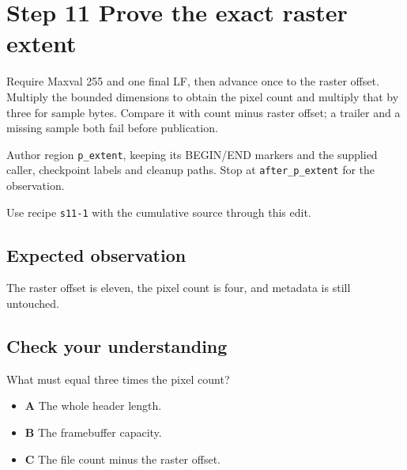 \section{Step 11 Prove the exact raster extent}\label{ppm-s11}

Require Maxval 255 and one final LF, then advance once to the raster offset. Multiply the bounded dimensions to obtain the pixel count and multiply that by three for sample bytes. Compare it with count minus raster offset; a trailer and a missing sample both fail before publication.

Author region \texttt{p\_extent}, keeping its BEGIN/END markers and the supplied caller, checkpoint labels and cleanup paths. Stop at \texttt{after\_p\_extent} for the observation.

Use recipe \texttt{s11-1} with the cumulative source through this edit.

\subsection{Expected observation}
The raster offset is eleven, the pixel count is four, and metadata is still untouched.

\subsection{Check your understanding}
What must equal three times the pixel count?

\begin{itemize}
\item \textbf{A} The whole header length.
\item \textbf{B} The framebuffer capacity.
\item \textbf{C} The file count minus the raster offset.
\end{itemize}
